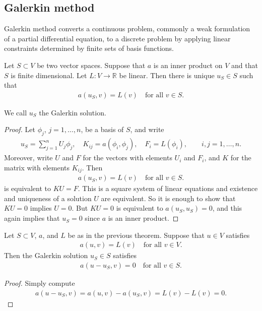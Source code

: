 \documentclass[12pt,oneside]{amsart}
\begin{document}
\subsection{Galerkin method}

Galerkin method converts a continuous problem, commonly a weak formulation of a partial differential equation, to a discrete problem by applying linear constraints determined by finite sets of basis functions.

\begin{theorem}\label{th_gsol}
Let $S \subset V$ be two vector spaces.
Suppose that $a$ is an inner product on $V$ and that $S$ is finite dimensional. 
Let $L : V \to \mathbb R$ be linear. Then there is unique $u_S \in S$ such that 
    \begin{align*}
a(u_S,v) = L(v) \quad \text{for all $v \in S$}.
    \end{align*}
\end{theorem}
We call $u_S$ the Galerkin solution.
\begin{proof}
Let $\phi_j$, $j=1,\dots,n$, be a basis of $S$, and write
    \begin{align*}
u_S = \sum_{j=1}^n U_j \phi_j, 
\quad
K_{ij} = a(\phi_i, \phi_j),
\quad
F_i = L(\phi_i), 
\qquad i,j=1,\dots,n.
    \end{align*}
Moreover, write $U$ and $F$ for the vectors with elements $U_i$ and $F_i$, and $K$ for the matrix with elements $K_{ij}$. Then
    \begin{align*}
a(u_S,v) = L(v) \quad \text{for all $v \in S$}.
    \end{align*}
is equivalent to $KU = F$. This is a square system of linear equations and existence and uniqueness of a solution $U$ are equivalent. So it is enough to show that $KU = 0$ implies $U = 0$. But $KU = 0$ is equivalent to $a(u_S, u_S) = 0$, and this again implies that $u_S = 0$ since $a$ is an inner product.
\end{proof}

\begin{lemma}
Let $S \subset V$, $a$, and $L$ be as in the previous theorem. Suppose that $u \in V$ satisfies
    \begin{align*}
a(u, v) = L(v) \quad \text{for all $v \in V$}.
    \end{align*}
Then the Galerkin solution $u_S  \in S$ satisfies
    \begin{align*}
a(u-u_S,v) = 0 \quad \text{for all $v \in S$}.
    \end{align*}
\end{lemma}
\begin{proof}
Simply compute
    \begin{align*}
a(u-u_S,v) = a(u, v) - a(u_S, v) = L(v) - L(v) = 0.
    \end{align*}
\end{proof}
\end{document}
